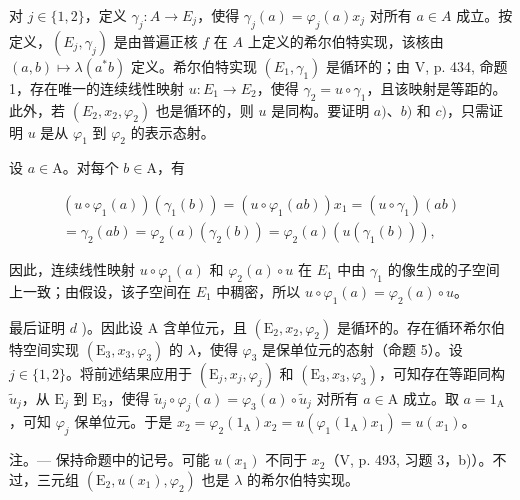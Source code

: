 对 \(j \in \{1,2\}\)，定义 \(\gamma_j \colon A \to E_j\)，使得 \(\gamma_j(a) = \varphi_j(a)x_j\) 对所有 \(a \in A\) 成立。按定义，\((E_j, \gamma_j)\) 是由普遍正核 \(f\) 在 \(A\) 上定义的希尔伯特实现，该核由 \((a,b) \mapsto \lambda(a^*b)\) 定义。希尔伯特实现 \((E_1, \gamma_1)\) 是循环的；由 V, p. 434, 命题 1，存在唯一的连续线性映射 \(u \colon E_1 \to E_2\)，使得 \(\gamma_2 = u \circ \gamma_1\)，且该映射是等距的。此外，若 \((E_2, x_2, \varphi_2)\) 也是循环的，则 \(u\) 是同构。要证明 \(a)\)、\(b)\) 和 \(c)\)，只需证明 \(u\) 是从 \(\varphi_1\) 到 \(\varphi_2\) 的表示态射。

设 \(a \in \mathrm{A}\)。对每个 \(b \in \mathrm{A}\)，有

\[
\begin{array}{c} (u \circ \varphi_ {1} (a)) (\gamma_ {1} (b)) = (u \circ \varphi_ {1} (a b)) x _ {1} = (u \circ \gamma_ {1}) (a b) \\ = \gamma_ {2} (a b) = \varphi_ {2} (a) (\gamma_ {2} (b)) = \varphi_ {2} (a) (u (\gamma_ {1} (b))), \end{array}
\]

因此，连续线性映射 \(u \circ \varphi_1(a)\) 和 \(\varphi_2(a) \circ u\) 在 \(E_1\) 中由 \(\gamma_1\) 的像生成的子空间上一致；由假设，该子空间在 \(E_1\) 中稠密，所以 \(u \circ \varphi_1(a) = \varphi_2(a) \circ u\)。

最后证明 \(d\) )。因此设 A 含单位元，且 \((\mathrm{E}_2, x_2, \varphi_2)\) 是循环的。存在循环希尔伯特空间实现 \((\mathrm{E}_3, x_3, \varphi_3)\) 的 \(\lambda\)，使得 \(\varphi_3\) 是保单位元的态射（命题 5）。设 \(j \in \{1, 2\}\)。将前述结果应用于 \((\mathrm{E}_j, x_j, \varphi_j)\) 和 \((\mathrm{E}_3, x_3, \varphi_3)\)，可知存在等距同构 \(\widetilde{u}_j\)，从 \(\mathrm{E}_j\) 到 \(\mathrm{E}_3\)，使得 \(\widetilde{u}_j \circ \varphi_j(a) = \varphi_3(a) \circ \widetilde{u}_j\) 对所有 \(a \in \mathrm{A}\) 成立。取 \(a = 1_{\mathrm{A}}\)，可知 \(\varphi_j\) 保单位元。于是 \(x_2 = \varphi_2(1_{\mathrm{A}})x_2 = u(\varphi_1(1_{\mathrm{A}})x_1) = u(x_1)\)。

注。--- 保持命题中的记号。可能 \(u(x_{1})\) 不同于 \(x_{2}\)（V, p. 493, 习题 3，b)）。不过，三元组 \((\mathrm{E}_{2}, u(x_{1}), \varphi_{2})\) 也是 \(\lambda\) 的希尔伯特实现。

